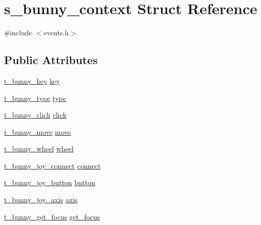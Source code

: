 \hypertarget{structs__bunny__context}{\section{s\-\_\-bunny\-\_\-context Struct Reference}
\label{structs__bunny__context}
}


{\ttfamily \#include $<$events.\-h$>$}

\subsection*{Public Attributes}
\begin{DoxyCompactItemize}
\item 
\hyperlink{events_8h_a923505573510fc2245f6b458eb46e682}{t\-\_\-bunny\-\_\-key} \hyperlink{structs__bunny__context_ad4dae332c9d39800a10216eb3dd22173}{key}
\item 
\hyperlink{events_8h_a8f59b6ad23db7f96d0862c3f9d91ea8b}{t\-\_\-bunny\-\_\-type} \hyperlink{structs__bunny__context_a09e78fc6f235790fb307e3d754a37cc7}{type}
\item 
\hyperlink{events_8h_a10892e056f3e976b4bba845d113b83d3}{t\-\_\-bunny\-\_\-click} \hyperlink{structs__bunny__context_a4ea9bf3ea84a7b4fe872ccc26c46a309}{click}
\item 
\hyperlink{events_8h_adca2c49e1e58405923f93a011f1c7213}{t\-\_\-bunny\-\_\-move} \hyperlink{structs__bunny__context_abb695dc2284c1372ded629b6d09886a2}{move}
\item 
\hyperlink{events_8h_a597cb9cea116b79a24ed5d91ef40cb32}{t\-\_\-bunny\-\_\-wheel} \hyperlink{structs__bunny__context_a43f726e270fb1747ee94bb5bbcae8f86}{wheel}
\item 
\hyperlink{events_8h_a41e34e419406c012af86c340c97068bb}{t\-\_\-bunny\-\_\-joy\-\_\-connect} \hyperlink{structs__bunny__context_a7707c3166e06b3e64544c201520469ce}{connect}
\item 
\hyperlink{events_8h_a349a528991e49278fe9cb485452ba6c5}{t\-\_\-bunny\-\_\-joy\-\_\-button} \hyperlink{structs__bunny__context_af1bcaa6ef42b26493c314f6908a3873b}{button}
\item 
\hyperlink{events_8h_a762d924743c3e275802ee599cb2b13a5}{t\-\_\-bunny\-\_\-joy\-\_\-axis} \hyperlink{structs__bunny__context_a7bc1317c234a07200917b7432475d879}{axis}
\item 
\hyperlink{events_8h_a14890b94609d8b3721fd3375bd76f215}{t\-\_\-bunny\-\_\-get\-\_\-focus} \hyperlink{structs__bunny__context_a3329aec27dda8cde860c8b555e8d436f}{get\-\_\-focus}

\end{DoxyCompactItemize}
